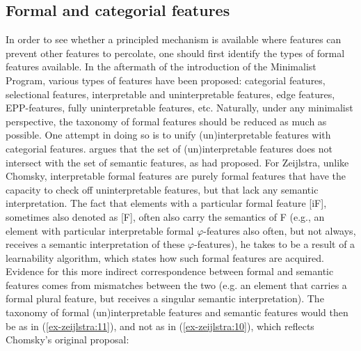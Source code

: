 \documentclass[output=paper
,modfonts
,nonflat]{langsci/langscibook}
\begin{document}
\subsection{Formal and categorial features}
In order to see whether a principled mechanism is available where features can prevent other features to percolate, one should first identify the types of formal features available. In the aftermath of the introduction of the Minimalist Program, various types of features have been proposed: categorial features, selectional features, interpretable and uninterpretable features, edge features, EPP-features, fully uninterpretable features, etc. Naturally, under any minimalist perspective, the taxonomy of formal features should be reduced as much as possible. One attempt in doing so is to unify (un)interpretable features with categorial features. \citet{Zeijlstra2014} argues that the set of (un)interpretable features does not intersect with the set of semantic features, as \citet{Chomsky1995} had proposed. For Zeijlstra, unlike Chomsky, interpretable formal features are purely formal features that have the capacity to check off uninterpretable features, but that lack any semantic interpretation. The fact that elements with a particular formal feature {[}iF{]}, sometimes also denoted as {[}F{]}, often also carry the semantics of F (e.g., an element with particular interpretable formal $\varphi$-features also often, but not always, receives a semantic interpretation of these $\varphi$-features), he takes to be a result of a learnability algorithm, which states how such formal features are acquired. Evidence for this more indirect correspondence between formal and semantic features comes from mismatches between the two (e.g. an element that carries a formal plural feature, but receives a singular semantic interpretation). The taxonomy of formal (un)interpretable features and semantic features would then be as in (\ref{ex-zeijlstra:11}), and not as in (\ref{ex-zeijlstra:10}), which reflects Chomsky’s original proposal:
\end{document}
